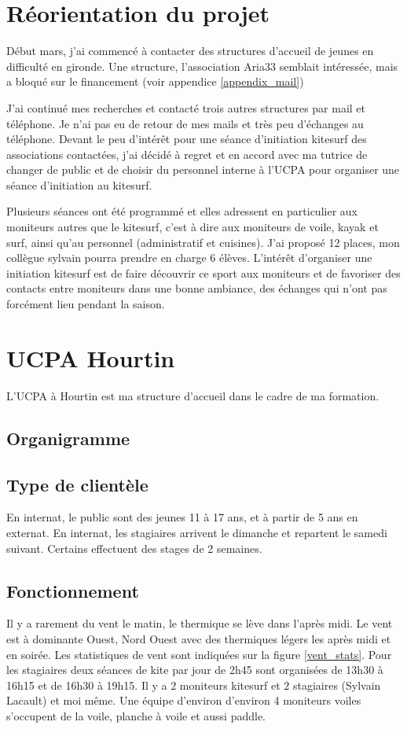 \documentclass[12pt,a4paper]{report}
\begin{document}
\section{Réorientation du projet}

Début mars, j'ai commencé à contacter des structures d'accueil de jeunes 
en difficulté en gironde. Une structure, l'association Aria33 semblait 
intéressée, mais a bloqué sur le financement (voir appendice \ref{appendix_mail})

J'ai continué mes recherches et contacté trois autres structures par mail et
téléphone. Je n'ai pas eu de retour de mes mails et très peu d'échanges 
au téléphone. 
Devant le peu d’intérêt pour une séance d'initiation kitesurf
des associations contactées, j'ai décidé à regret et en accord avec ma tutrice
de changer de public et de choisir du personnel interne à l'UCPA pour organiser
une séance d'initiation au kitesurf. 

Plusieurs séances ont été programmé et elles adressent en particulier
aux moniteurs autres que le kitesurf, c'est à dire aux moniteurs de voile, kayak et surf, 
ainsi qu'au personnel (administratif et cuisines).
J'ai  proposé 12 places, mon collègue sylvain pourra prendre en charge 6 élèves.
L'intér\^et d'organiser une initiation kitesurf est de faire découvrir ce
sport aux moniteurs et  de favoriser des contacts entre moniteurs dans
une bonne ambiance, des échanges qui n'ont pas forcément lieu pendant la saison.

\section{UCPA Hourtin}
L'UCPA à Hourtin est ma structure d'accueil dans le cadre de ma formation.
\subsection{Organigramme}
\subsection{Type de clientèle}
En internat, le public sont des jeunes 11 à 17 ans, et  à partir de 5 ans  en externat.
En internat, les stagiaires arrivent le dimanche et repartent le samedi suivant.
Certains effectuent des stages de 2 semaines.
\subsection{Fonctionnement}
Il y a rarement du vent le matin, le thermique se lève dans l'après midi.
Le vent est à dominante Ouest, Nord Ouest avec des thermiques légers les après midi et 
en soirée. Les statistiques de vent sont indiquées sur la figure \ref{vent_stats}.
Pour les stagiaires deux séances de kite par jour de 2h45 sont organisées de 13h30 à 16h15
et de 16h30 à 19h15.
Il y a 2 moniteurs kitesurf et 2 stagiaires (Sylvain Lacault) et moi m\^eme.
Une équipe d'environ d'environ 4 moniteurs voiles s'occupent de la voile, 
planche à voile et aussi paddle.
\end{document}

